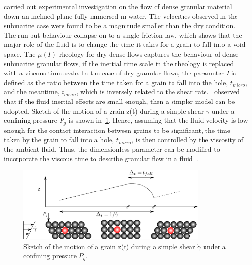 \citet{Cassar2005} carried out experimental 
investigation on the flow of dense granular material down an inclined plane 
fully-immersed in water. The velocities observed in the submarine case were 
found to be a magnitude smaller than the dry condition. The run-out behaviour 
collapse on to a single friction law, which shows that the major role of the 
fluid is to change the time it takes for a grain to fall into a void-space. 
The $\mu(\textit{I})$ rheology for dry dense flows captures the behaviour of 
dense submarine granular flows, if the inertial time scale in the rheology is 
replaced with a viscous time scale. In the case of dry granular flows, the 
parameter \textit{I} is defined as the ratio between the time taken for a 
grain to fall into the hole, $\textit{t}_{\textit{micro}}$, and the 
meantime, $\textit{t}_{\textit{mean}}$, which is inversely related to the shear 
rate.~\citet{Pitman2005} observed that if the fluid inertial effects are small 
enough, then a simpler model can be adopted. Sketch of the motion of a grain 
z(t) during a simple shear $\dot{\gamma}$ under a confining pressure $P_g$ is 
shown in~\cref{fig:tmicro}. Hence, assuming that the fluid 
velocity is low enough for the contact interaction between grains to be 
significant, the time taken by the grain to fall into a hole, 
$\textit{t}_{\textit{micro}}$, is  then controlled by the viscosity of the 
ambient fluid. Thus, the dimensionless parameter can be modified to incorporate 
the viscous time to describe granular flow in a fluid~\citep{Pouliquen2005}. 

\begin{figure}[htbp]
\centering
\includegraphics[width=0.85\textwidth]{tmicro}
\caption{Sketch of the motion of a grain z(t) during a simple shear 
$\dot{\gamma}$ under a confining pressure $P_g$.}
\label{fig:tmicro}
\end{figure}



